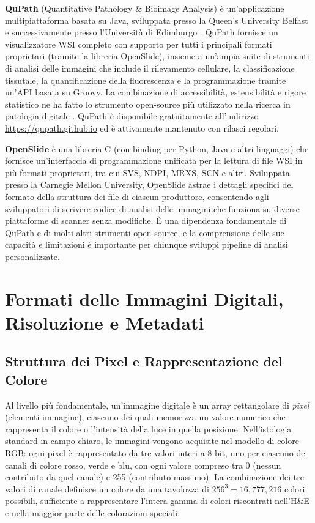\textbf{QuPath} (Quantitative Pathology \& Bioimage Analysis) è un'applicazione multipiattaforma basata su Java, sviluppata presso la Queen's University Belfast e successivamente presso l'Università di Edimburgo \cite{bankhead2017}. QuPath fornisce un visualizzatore WSI completo con supporto per tutti i principali formati proprietari (tramite la libreria OpenSlide), insieme a un'ampia suite di strumenti di analisi delle immagini che include il rilevamento cellulare, la classificazione tissutale, la quantificazione della fluorescenza e la programmazione tramite un'API basata su Groovy. La combinazione di accessibilità, estensibilità e rigore statistico ne ha fatto lo strumento open-source più utilizzato nella ricerca in patologia digitale \cite{bankhead2022}. QuPath è disponibile gratuitamente all'indirizzo \url{https://qupath.github.io} ed è attivamente mantenuto con rilasci regolari.

\textbf{OpenSlide} è una libreria C (con binding per Python, Java e altri linguaggi) che fornisce un'interfaccia di programmazione unificata per la lettura di file WSI in più formati proprietari, tra cui SVS, NDPI, MRXS, SCN e altri. Sviluppata presso la Carnegie Mellon University, OpenSlide astrae i dettagli specifici del formato della struttura dei file di ciascun produttore, consentendo agli sviluppatori di scrivere codice di analisi delle immagini che funziona su diverse piattaforme di scanner senza modifiche. È una dipendenza fondamentale di QuPath e di molti altri strumenti open-source, e la comprensione delle sue capacità e limitazioni è importante per chiunque sviluppi pipeline di analisi personalizzate.

\section{Formati delle Immagini Digitali, Risoluzione e Metadati}

\subsection{Struttura dei Pixel e Rappresentazione del Colore}

Al livello più fondamentale, un'immagine digitale è un array rettangolare di \emph{pixel} (elementi immagine), ciascuno dei quali memorizza un valore numerico che rappresenta il colore o l'intensità della luce in quella posizione. Nell'istologia standard in campo chiaro, le immagini vengono acquisite nel modello di colore RGB: ogni pixel è rappresentato da tre valori interi a 8 bit, uno per ciascuno dei canali di colore rosso, verde e blu, con ogni valore compreso tra 0 (nessun contributo da quel canale) e 255 (contributo massimo). La combinazione dei tre valori di canale definisce un colore da una tavolozza di $256^3 = 16{,}777{,}216$ colori possibili, sufficiente a rappresentare l'intera gamma di colori riscontrati nell'H\&E e nella maggior parte delle colorazioni speciali.

